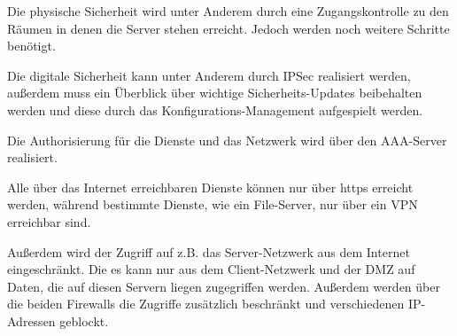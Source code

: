 Die physische Sicherheit wird unter Anderem durch eine Zugangskontrolle zu den Räumen in denen die Server stehen erreicht. Jedoch werden noch weitere Schritte benötigt.

Die digitale Sicherheit kann unter Anderem durch IPSec realisiert werden, außerdem muss ein Überblick über wichtige Sicherheits-Updates beibehalten werden und diese durch das Konfigurations-Management aufgespielt werden.

Die Authorisierung für die Dienste und das Netzwerk wird über den AAA-Server realisiert.

Alle über das Internet erreichbaren Dienste können nur über https erreicht werden, während bestimmte Dienste, wie ein File-Server, nur über ein VPN erreichbar sind.

Außerdem wird der Zugriff auf z.B. das Server-Netzwerk aus dem Internet eingeschränkt. Die es kann nur aus dem Client-Netzwerk und der DMZ auf Daten, die auf diesen Servern liegen zugegriffen werden. Außerdem werden über die beiden Firewalls die Zugriffe zusätzlich beschränkt und verschiedenen IP-Adressen geblockt.

